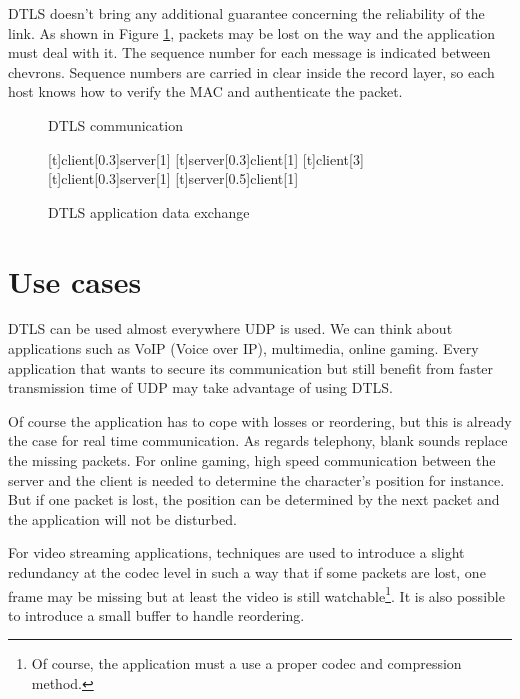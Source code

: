 DTLS doesn't bring any additional guarantee concerning the reliability of the link. As shown in Figure \ref{fig:dtls-data}, packets may be lost on the way and the application must deal with it. The sequence number for each message is indicated between chevrons. Sequence numbers are carried in clear inside the record layer, so each host knows how to verify the MAC and authenticate the packet.

\begin{figure}[!ht]
\centering
\begin{msc}[r]{DTLS communication}

\setlength{\instfootheight}{0em}
\setlength{\instheadheight}{0em}
\setlength{\instdist}{0.7\linewidth}
\setlength{\levelheight}{3em}


[t]{client}[0.3]{server}[1]
\nextlevel
{}[t]{server}[0.3]{client}[1]
\nextlevel
\nextlevel
{}[t]{}{client}[3]
\nextlevel
{}[t]{client}[0.3]{server}[1]
\nextlevel
{}[t]{server}[0.5]{client}[1]
\nextlevel
\nextlevel
\end{msc}
\caption{DTLS application data exchange}
\label{fig:dtls-data}
\end{figure}

\section{Use cases}

\label{sec:dtls-usage}

DTLS can be used almost everywhere UDP is used. We can think about applications such as VoIP (Voice over IP), multimedia, online gaming. Every application that wants to secure its communication but still benefit from faster transmission time of UDP may take advantage of using DTLS.

Of course the application has to cope with losses or reordering, but this is already the case for real time communication. As regards telephony, blank sounds replace the missing packets. For online gaming, high speed communication between the server and the client is needed to determine the character's position for instance. But if one packet is lost, the position can be determined by the next packet and the application will not be disturbed.

For video streaming applications, techniques are used to introduce a slight redundancy at the codec level in such a way that if some packets are lost, one frame may be missing but at least the video is still watchable\footnote{Of course, the application must a use a proper codec and compression method.}. It is also possible to introduce a small buffer to handle reordering.

